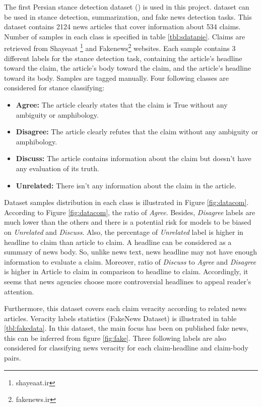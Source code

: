 The first Persian stance detection dataset (\cite{stance_persian})  is used in this project. \cite{stance_persian} dataset can be used in stance detection, summarization, and fake news detection tasks. This dataset contains 2124 news articles that cover information about 534 claims. Number of samples in each class is specified in table \ref{tbl:sdatapie}. Claims are retrieved from Shayeaat \footnote{shayeaat.ir} and Fakenews\footnote{fakenews.ir} websites. Each sample contains 3 different labels for the stance detection task, containing the article's headline toward the claim, the article's body toward the claim, and the article's headline toward its body. Samples are tagged manually. Four following classes are considered for stance classifying:
\begin{itemize}
	\item {\color{green!70!black}\textbf{Agree:}} The article clearly states that the claim is True without any ambiguity or amphibology. 
	\item {\color{red!70!black}\textbf{Disagree:}} The article clearly refutes that the claim without any ambiguity or amphibology. 
	\item {\color{yellow!70!black}\textbf{Discuss:}} The article contains information about the claim but doesn't have any evaluation of its truth. 
	\item {\color{gray!}\textbf{Unrelated:}} There isn't any information about the claim in the article.
\end{itemize}
Dataset samples distribution in each class is illustrated in Figure \ref{fig:datacom}. According to Figure \ref{fig:datacom}, the ratio of \textit{Agree}. Besides, \textit{Disagree} labels are much lower than the others and there is a potential risk for models to be biased on \textit{Unrelated} and \textit{Discuss}. Also, the percentage of \textit{Unrelated} label is higher in headline to claim than article to claim. A headline can be considered as a summary of news body. So, unlike news text, news headline may not have enough information to evaluate a claim.  Moreover, ratio of \textit{Discuss} to \textit{Agree} and \textit{Disagree} is higher in Article to claim in comparison to headline to claim. Accordingly, it seems that news agencies choose more controversial headlines to appeal reader's attention.

Furthermore, this dataset covers each claim veracity according to related news articles. Veracity labels statistics (FakeNews Dataset) is illustrated in table \ref{tbl:fakedata}. In this dataset, the main focus has been on published fake news, this can be inferred from figure \ref{fig:fake}. Three following labels are also considered for classifying news veracity for each claim-headline and claim-body pairs.

